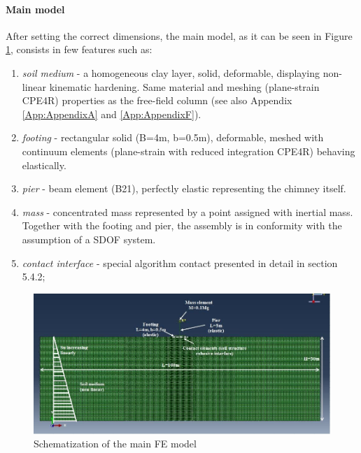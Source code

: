 	\paragraph{Main model}
	After setting the correct dimensions, the main model, as it can be seen in Figure \ref{mainM}, consists in few features such as:
	\begin{enumerate}
		\item \textit{soil medium} - a homogeneous clay layer, solid, deformable, displaying non-linear kinematic hardening. Same material and meshing (plane-strain CPE4R) properties as the free-field column (see also Appendix \ref{App:AppendixA} and \ref{App:AppendixF}).
		\item \textit{footing} -  rectangular solid (B=4m, b=0.5m), deformable, meshed with continuum elements (plane-strain with reduced integration CPE4R) behaving elastically.
		\item \textit{pier} - beam element (B21), perfectly elastic representing the chimney itself.
		\item \textit{mass} - concentrated mass represented by a point assigned with inertial mass. Together with the footing and pier, the assembly is in conformity with the assumption of a SDOF system.
		\item \textit{contact interface} - special algorithm contact presented in detail in section 5.4.2;
	\end{enumerate}
	
		\begin{figure}[!h]
			\centering
			\includegraphics[width=0.9\linewidth]{"mainmodel"}
			\caption{Schematization of the main FE model}
			\label{mainM}
		\end{figure}
		
